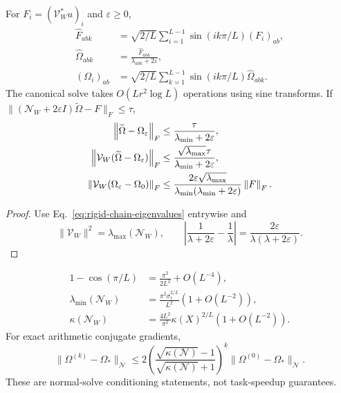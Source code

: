 \begin{corollary}
For $F_i=(\mathcal V_W^*u)_i$ and $\varepsilon\geq0$,
\begin{align}
\widehat F_{abk}
&=\sqrt{2/L}\sum_{i=1}^{L-1}\sin(ik\pi/L)(F_i)_{ab},\\
\widehat\Omega_{abk}
&=\frac{\widehat F_{abk}}{\lambda_{abk}+2\varepsilon},\\
(\Omega_i)_{ab}
&=\sqrt{2/L}\sum_{k=1}^{L-1}\sin(ik\pi/L)\widehat\Omega_{abk}.
\label{eq:rigid-dst-solve}
\end{align}
The canonical solve takes $O(Lr^2\log L)$ operations using sine transforms.
If $\|(\mathcal N_W+2\varepsilon I)\widetilde\Omega-F\|_F\leq\tau$,
\begin{align}
\left\lVert\widetilde\Omega-\Omega_\varepsilon\right\rVert_F
&\leq\frac{\tau}{\lambda_{\min}+2\varepsilon},\\
\left\lVert\mathcal V_W(\widetilde\Omega-\Omega_\varepsilon)\right\rVert_F
&\leq\frac{\sqrt{\lambda_{\max}}\tau}
{\lambda_{\min}+2\varepsilon},\\
\left\lVert\mathcal V_W(\Omega_\varepsilon-\Omega_0)\right\rVert_F
&\leq\frac{2\varepsilon\sqrt{\lambda_{\max}}}
{\lambda_{\min}(\lambda_{\min}+2\varepsilon)}\left\lVert F\right\rVert_F .
\end{align}
\end{corollary}
\begin{proof}
Use Eq.~\eqref{eq:rigid-chain-eigenvalues} entrywise and
\begin{equation}
\|\mathcal V_W\|^2=\lambda_{\max}(\mathcal N_W),\qquad
\left|\frac1{\lambda+2\varepsilon}-\frac1\lambda\right|
=\frac{2\varepsilon}{\lambda(\lambda+2\varepsilon)}.
\end{equation}
\end{proof}

\begin{corollary}
\begin{align}
1-\cos(\pi/L)&=\frac{\pi^2}{2L^2}+O(L^{-4}),\\
\lambda_{\min}(\mathcal N_W)
&=\frac{\pi^2\sigma_r^{2/L}}{L^2}(1+O(L^{-2})),\\
\kappa(\mathcal N_W)
&=\frac{4L^2}{\pi^2}\kappa(X)^{2/L}(1+O(L^{-2})).
\end{align}
For exact arithmetic conjugate gradients,
\begin{equation}
\|\Omega^{(k)}-\Omega_*\|_{\mathcal N}
\leq2\left(\frac{\sqrt{\kappa(\mathcal N)}-1}
{\sqrt{\kappa(\mathcal N)}+1}\right)^k
\|\Omega^{(0)}-\Omega_*\|_{\mathcal N}.
\end{equation}
These are normal-solve conditioning statements, not task-speedup guarantees.
\end{corollary}

